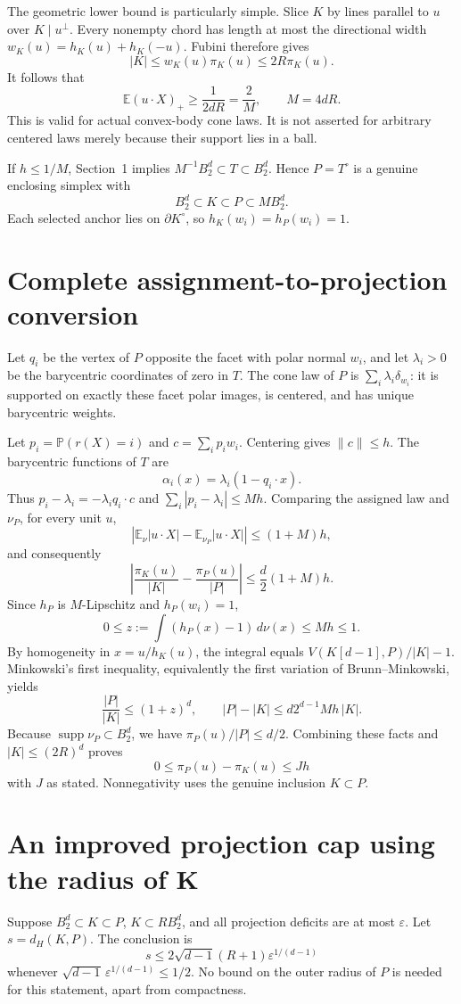 \documentclass[11pt,letterpaper]{article}
\newcommand{\EE}{\mathbb E}
\newcommand{\PP}{\mathbb P}
\newcommand{\BB}{B_2^d}
\newcommand{\supp}{\operatorname{supp}}
\newcommand{\pos}[1]{(#1)_+}
\begin{document}
The geometric lower bound is particularly simple. Slice $K$ by lines
parallel to $u$ over $K\mid u^\perp$. Every nonempty chord has length at most
the directional width $w_K(u)=h_K(u)+h_K(-u)$. Fubini therefore gives
\[
 |K|\le w_K(u)\pi_K(u)\le2R\pi_K(u).
\]
It follows that
\[
 \EE\pos{u\cdot X}\ge\frac1{2dR}=\frac2M,\qquad M=4dR.
\]
This is valid for actual convex-body cone laws. It is not asserted for
arbitrary centered laws merely because their support lies in a ball.

If $h\le1/M$, Section~1 implies $M^{-1}\BB\subset T\subset\BB$. Hence
$P=T^\circ$ is a genuine enclosing simplex with
\[
 \BB\subset K\subset P\subset M\BB.
\]
Each selected anchor lies on $\partial K^\circ$, so
$h_K(w_i)=h_P(w_i)=1$.

\section{Complete assignment-to-projection conversion}
Let $q_i$ be the vertex of $P$ opposite the facet with polar normal $w_i$,
and let $\lambda_i>0$ be the barycentric coordinates of zero in $T$. The
cone law of $P$ is $\sum_i\lambda_i\delta_{w_i}$: it is supported on exactly
these facet polar images, is centered, and has unique barycentric weights.

Let $p_i=\PP(r(X)=i)$ and $c=\sum_i p_iw_i$. Centering gives $\|c\|\le h$.
The barycentric functions of $T$ are
\[
 \alpha_i(x)=\lambda_i(1-q_i\cdot x).
\]
Thus $p_i-\lambda_i=-\lambda_i q_i\cdot c$ and
$\sum_i|p_i-\lambda_i|\le Mh$. Comparing the assigned law and $\nu_P$,
for every unit $u$,
\[
 \left|\EE_\nu|u\cdot X|-\EE_{\nu_P}|u\cdot X|\right|\le(1+M)h,
\]
and consequently
\[
 \left|\frac{\pi_K(u)}{|K|}-\frac{\pi_P(u)}{|P|}\right|
 \le\frac d2(1+M)h.
\]
Since $h_P$ is $M$-Lipschitz and $h_P(w_i)=1$,
\[
 0\le z:=\int(h_P(x)-1)\,d\nu(x)\le Mh\le1.
\]
By homogeneity in $x=u/h_K(u)$, the integral equals
$V(K[d-1],P)/|K|-1$. Minkowski's first inequality, equivalently the first
variation of Brunn--Minkowski, yields
\[
 \frac{|P|}{|K|}\le(1+z)^d,\qquad
 |P|-|K|\le d2^{d-1}Mh\,|K|.
\]
Because $\supp\nu_P\subset\BB$, we have $\pi_P(u)/|P|\le d/2$. Combining
these facts and $|K|\le(2R)^d$ proves
\[
 0\le\pi_P(u)-\pi_K(u)\le Jh
\]
with $J$ as stated. Nonnegativity uses the genuine inclusion $K\subset P$.

\section{An improved projection cap using the radius of K}
Suppose $\BB\subset K\subset P$, $K\subset R\BB$, and all projection
deficits are at most $\varepsilon$. Let $s=d_H(K,P)$. The conclusion is
\[
 s\le2\sqrt{d-1}(R+1)\varepsilon^{1/(d-1)}
\]
whenever $\sqrt{d-1}\,\varepsilon^{1/(d-1)}\le1/2$. No bound on the outer
radius of $P$ is needed for this statement, apart from compactness.
\end{document}
